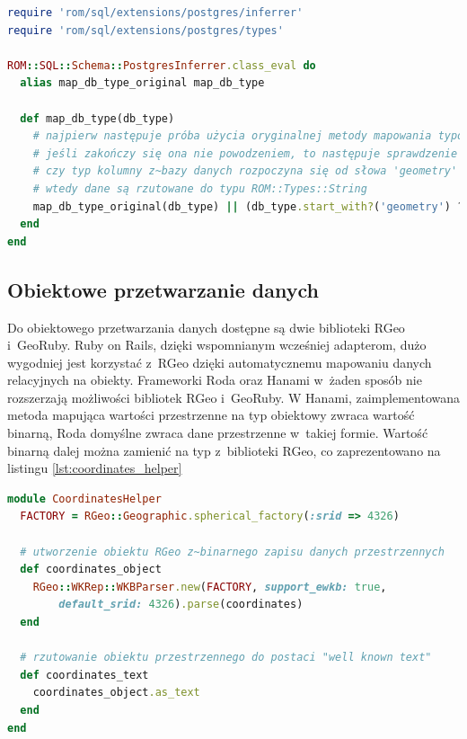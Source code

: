 \documentclass[printmode]{mgr}
\begin{document}
 \newpage

\begin{lstlisting}[language=Ruby, caption={Obsługa typów geometrycznych z~biblioteki PostGIS przez Hanami}, label=lst:postgis_patching]
require 'rom/sql/extensions/postgres/inferrer'
require 'rom/sql/extensions/postgres/types'

ROM::SQL::Schema::PostgresInferrer.class_eval do
  alias map_db_type_original map_db_type

  def map_db_type(db_type)
    # najpierw następuje próba użycia oryginalnej metody mapowania typów
    # jeśli zakończy się ona nie powodzeniem, to następuje sprawdzenie 
    # czy typ kolumny z~bazy danych rozpoczyna się od słowa 'geometry'
    # wtedy dane są rzutowane do typu ROM::Types::String
    map_db_type_original(db_type) || (db_type.start_with?('geometry') ? ROM::Types::String : nil)
  end
end
\end{lstlisting}

\subsection{Obiektowe przetwarzanie danych}

 Do obiektowego przetwarzania danych dostępne są dwie biblioteki RGeo i~GeoRuby. Ruby on Rails, dzięki wspomnianym wcześniej adapterom, dużo wygodniej jest korzystać z~RGeo dzięki automatycznemu mapowaniu danych relacyjnych na obiekty.
 Frameworki Roda oraz Hanami w~żaden sposób nie rozszerzają możliwości bibliotek RGeo i~GeoRuby. W  Hanami, zaimplementowana metoda mapująca wartości przestrzenne na typ obiektowy zwraca wartość binarną, Roda domyślne zwraca dane przestrzenne w~takiej formie. Wartość binarną dalej można zamienić na typ z~biblioteki RGeo, co zaprezentowano na listingu \ref{lst:coordinates_helper}

 \begin{lstlisting}[language=Ruby, caption={Tworzenie obiektu RGeo z~zapisu binarnego danych przestrzennych}, label=lst:coordinates_helper]
module CoordinatesHelper
  FACTORY = RGeo::Geographic.spherical_factory(:srid => 4326)

  # utworzenie obiektu RGeo z~binarnego zapisu danych przestrzennych
  def coordinates_object
    RGeo::WKRep::WKBParser.new(FACTORY, support_ewkb: true,
        default_srid: 4326).parse(coordinates)
  end

  # rzutowanie obiektu przestrzennego do postaci "well known text"
  def coordinates_text
    coordinates_object.as_text
  end
end
\end{lstlisting}
\end{document}
